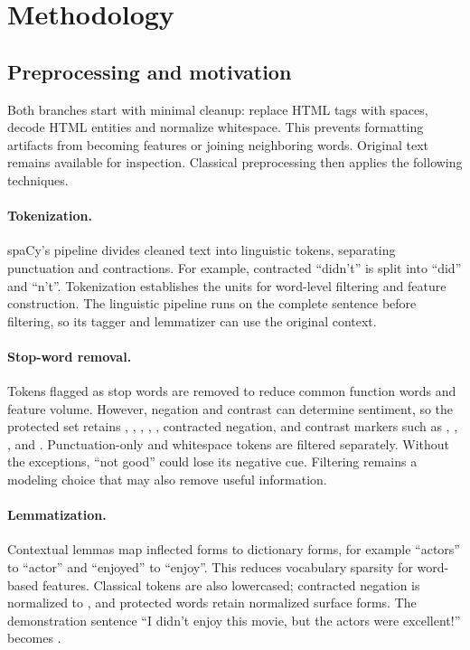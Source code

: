 \clearpage
\section{Methodology}\label{sec:methods}
\subsection{Preprocessing and motivation}\label{sec:preprocess}
Both branches start with minimal cleanup: replace HTML tags with spaces, decode
HTML entities and normalize whitespace. This prevents formatting artifacts from
becoming features or joining neighboring words. Original text remains available
for inspection. Classical preprocessing then applies the following techniques.

\paragraph{Tokenization.}
spaCy's  pipeline divides cleaned text into linguistic
tokens, separating punctuation and contractions. For example, contracted
``didn't'' is split into ``did'' and ``n't''. Tokenization establishes the units
for word-level filtering and feature construction. The linguistic pipeline runs
on the complete sentence before filtering, so its tagger and lemmatizer can use
the original context.

\paragraph{Stop-word removal.}
Tokens flagged as stop words are removed to reduce common function words and
feature volume. However, negation and contrast can determine sentiment, so the
protected set retains , , , ,
, contracted negation, and contrast markers such as ,
, ,  and . Punctuation-only
and whitespace tokens are filtered separately. Without the exceptions,
``not good'' could lose its negative cue. Filtering remains a modeling choice
that may also remove useful information.

\paragraph{Lemmatization.}
Contextual lemmas map inflected forms to dictionary forms, for example ``actors''
to ``actor'' and ``enjoyed'' to ``enjoy''. This reduces vocabulary sparsity for
word-based features. Classical tokens are also lowercased; contracted negation
is normalized to , and protected words retain normalized surface forms.
The demonstration sentence ``I didn't enjoy this movie, but the actors were
excellent!'' becomes .

